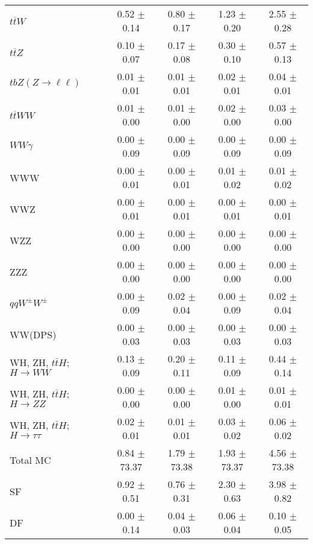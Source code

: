 \begin{tabular}{l|cccc}
                   $t\overline{t}W$ &  0.52 $\pm$  0.14 &  0.80 $\pm$  0.17 &  1.23 $\pm$  0.20 &  2.55 $\pm$  0.28 \\
                   $t\overline{t}Z$ &  0.10 $\pm$  0.07 &  0.17 $\pm$  0.08 &  0.30 $\pm$  0.10 &  0.57 $\pm$  0.13 \\
    $tbZ (Z \rightarrow \ell \ell)$ &  0.01 $\pm$  0.01 &  0.01 $\pm$  0.01 &  0.02 $\pm$  0.01 &  0.04 $\pm$  0.01 \\
                  $t\overline{t}WW$ &  0.01 $\pm$  0.00 &  0.01 $\pm$  0.00 &  0.02 $\pm$  0.00 &  0.03 $\pm$  0.00 \\
                         $WW\gamma$ &  0.00 $\pm$  0.09 &  0.00 $\pm$  0.09 &  0.00 $\pm$  0.09 &  0.00 $\pm$  0.09 \\
                                WWW &  0.00 $\pm$  0.01 &  0.00 $\pm$  0.01 &  0.01 $\pm$  0.02 &  0.01 $\pm$  0.02 \\
                                WWZ &  0.00 $\pm$  0.01 &  0.00 $\pm$  0.01 &  0.00 $\pm$  0.01 &  0.00 $\pm$  0.01 \\
                                WZZ &  0.00 $\pm$  0.00 &  0.00 $\pm$  0.00 &  0.00 $\pm$  0.00 &  0.00 $\pm$  0.00 \\
                                ZZZ &  0.00 $\pm$  0.00 &  0.00 $\pm$  0.00 &  0.00 $\pm$  0.00 &  0.00 $\pm$  0.00 \\
                 $qqW^{\pm}W^{\pm}$ &  0.00 $\pm$  0.09 &  0.02 $\pm$  0.04 &  0.00 $\pm$  0.09 &  0.02 $\pm$  0.04 \\
                            WW(DPS) &  0.00 $\pm$  0.03 &  0.00 $\pm$  0.03 &  0.00 $\pm$  0.03 &  0.00 $\pm$  0.03 \\
WH, ZH, $t\bar{t}H$; $H \rightarrow WW$ &  0.13 $\pm$  0.09 &  0.20 $\pm$  0.11 &  0.11 $\pm$  0.09 &  0.44 $\pm$  0.14 \\
WH, ZH, $t\bar{t}H$; $H \rightarrow ZZ$ &  0.00 $\pm$  0.00 &  0.00 $\pm$  0.00 &  0.01 $\pm$  0.00 &  0.01 $\pm$  0.01 \\
WH, ZH, $t\bar{t}H$; $H \rightarrow \tau\tau$ &  0.02 $\pm$  0.01 &  0.01 $\pm$  0.01 &  0.03 $\pm$  0.02 &  0.06 $\pm$  0.02 \\
\hline\hline
                           Total MC &  0.84 $\pm$ 73.37 &  1.79 $\pm$ 73.38 &  1.93 $\pm$ 73.37 &  4.56 $\pm$ 73.38 \\
\hline
                                 SF &  0.92 $\pm$  0.51 &  0.76 $\pm$  0.31 &  2.30 $\pm$  0.63 &  3.98 $\pm$  0.82 \\
                                 DF &  0.00 $\pm$  0.14 &  0.04 $\pm$  0.03 &  0.06 $\pm$  0.04 &  0.10 $\pm$  0.05 \\

\end{tabular}
